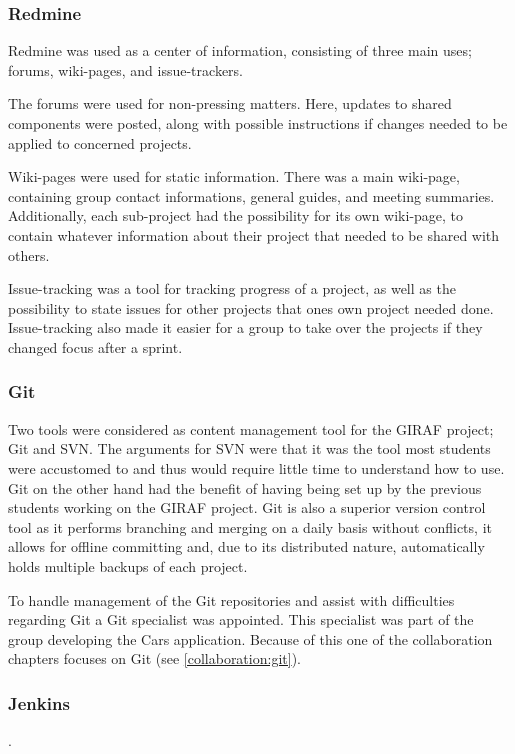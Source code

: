 \subsubsection{Redmine}
Redmine was used as a center of information, consisting of three main uses; forums, wiki-pages, and issue-trackers.

The forums were used for non-pressing matters.
Here, updates to shared components were posted, along with possible instructions if changes needed to be applied to concerned projects.

Wiki-pages were used for static information.
There was a main wiki-page, containing group contact informations, general guides, and meeting summaries.
Additionally, each sub-project had the possibility for its own wiki-page, to contain whatever information about their project that needed to be shared with others.

Issue-tracking was a tool for tracking progress of a project, as well as the possibility to state issues for other projects that ones own project needed done.
Issue-tracking also made it easier for a group to take over the projects if they changed focus after a sprint.

\subsubsection{Git}
Two tools were considered as content management tool for the GIRAF project; Git and SVN.
The arguments for SVN were that it was the tool most students were accustomed to and thus would require little time to understand how to use.
Git on the other hand had the benefit of having being set up by the previous students working on the GIRAF project.
Git is also a superior version control tool as it performs branching and merging on a daily basis without conflicts, it allows for offline committing and, due to its distributed nature, automatically holds multiple backups of each project.

To handle management of the Git repositories and assist with difficulties regarding Git a Git specialist was appointed.
This specialist was part of the group developing the Cars application.
Because of this one of the collaboration chapters focuses on Git (see \ref{collaboration:git}).

\subsubsection{Jenkins}
.

